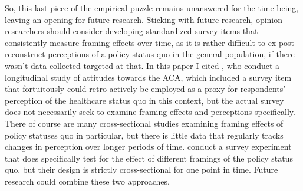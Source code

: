 \documentclass[11pt]{article}
\begin{document}
So, this last piece of the empirical puzzle remains unanswered for the time being, leaving an opening for future research. Sticking with future research, opinion researchers should consider developing standardized survey items that consistently measure framing effects over time, as it is rather difficult to ex post reconstruct perceptions of a policy status quo in the general population, if there wasn't data collected targeted at that. In this paper I cited \textcite[][]{Mettler2022}, who conduct a longitudinal study of attitudes towards the ACA, which included a survey item that fortuitously could retro-actively be employed as a proxy for respondents' perception of the healthcare status quo in this context, but the actual survey does not necessarily seek to examine framing effects and perceptions specifically. There of course are many cross-sectional studies examining framing effects of policy statuses quo in particular, but there is little data that regularly tracks changes in perception over longer periods of time. \textcite[][]{Haeder2024} conduct a survey experiment that does specifically test for the effect of different framings of the policy status quo, but their design is strictly cross-sectional for one point in time. Future research could combine these two approaches.


\newpage
\pagestyle{empty}
\begingroup
{}
\printbibliography
\endgroup
\end{document}
